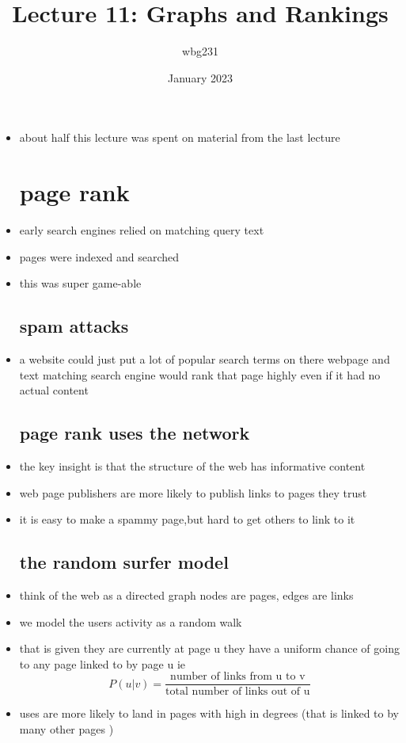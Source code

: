 \documentclass{article}
\title{Lecture 11: Graphs and Rankings }
\author{wbg231 }
\date{January 2023}
\begin{document}
\maketitle
\begin{itemize}
\item about half this lecture was spent on material from the last lecture 
\section{page rank}
\item early search engines relied on matching query text 
\item pages were indexed and searched 
\item this was super game-able
\subsection*{spam attacks}
\item a website could just put a lot of popular search terms on there webpage and text matching search engine would rank that page highly even if it had no actual content 
\subsection*{page rank uses the network}
\item the key insight is that the structure of the web has informative content 
\item web page publishers are more likely to publish links to pages they trust 
\item it is easy to make a spammy page,but hard to get others to link to it 
\subsection*{the random surfer model}
\item think of the web as a directed graph nodes are pages, edges are links
\item we model the users activity as a random walk 
\item that is given they are currently at page u they have a uniform chance of going to any page linked to by page u ie $$P(u|v)=\frac{\text{number of links from u to v}}{\text{total number of links out of u}}$$
\item uses are more likely to land in pages with high in degrees (that is linked to by many other pages )

\end{itemize}
\end{document}
